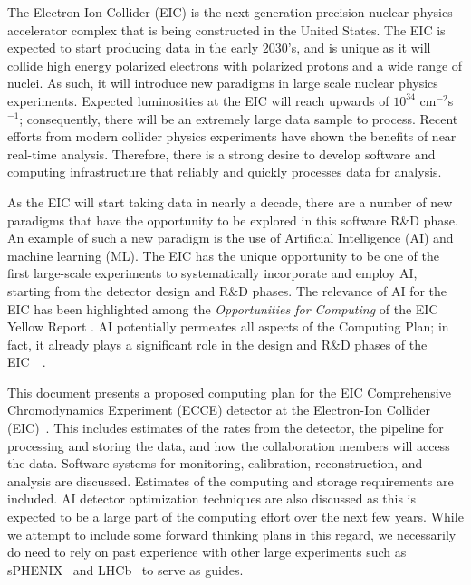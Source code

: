 

The Electron Ion Collider (EIC) is the next generation precision nuclear physics accelerator complex that is being constructed in the United States. The EIC is expected to start producing data in the early 2030's, and is unique as it will collide high energy polarized electrons with polarized protons and a wide range of nuclei. As such, it will introduce new paradigms in large scale nuclear physics experiments. Expected luminosities at the EIC will reach upwards of $10^{34}$ cm$^{-2}$s$^{-1}$; consequently, there will be an extremely large data sample to process. Recent efforts from modern collider physics experiments have shown the benefits of near real-time analysis. Therefore, there is a strong desire to develop software and computing infrastructure that reliably and quickly processes data for analysis. 



As the EIC will start taking data in nearly a decade, there are a number of new paradigms that have the opportunity to be explored in this software R\&D phase. An example of such a new paradigm is the use of Artificial Intelligence (AI) and machine learning (ML). The EIC has the unique opportunity to be one of the first large-scale experiments to systematically incorporate and employ AI, starting from the detector design and R\&D phases. The relevance of AI for the EIC has been highlighted among the \textit{Opportunities for Computing} of the EIC Yellow Report \cite{YellowReport}. AI potentially permeates all aspects of the Computing Plan; in fact, it already plays a significant role in the design and R\&D phases of the EIC~\cite{cisbani2020ai}~\cite{AI4EIC2021}.

This document presents a proposed computing plan for the EIC Comprehensive Chromodynamics Experiment (ECCE) detector at the Electron-Ion Collider (EIC)~\cite{YellowReport}. This includes estimates of the rates from the detector, the pipeline for processing and storing the data, and how the collaboration members will access the data. Software systems for monitoring, calibration, reconstruction, and analysis are discussed. Estimates of the computing and storage requirements are included. AI detector optimization techniques are also discussed as this is expected to be a large part of the computing effort over the next few years. While we attempt to include some forward thinking plans in this regard, we necessarily do need to rely on past experience with other large experiments such as sPHENIX~\cite{sphenix_computing_plan_2019} and LHCb~\cite{CAMPORAPEREZ2016280} to serve as guides.






